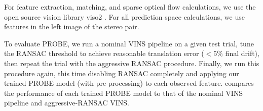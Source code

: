 For feature extraction, matching, and sparse optical flow calculations, we use the open source vision library \textsf{viso2} \citep{Geiger2011-xe}.
For all prediction space calculations, we use features in the left image of the stereo pair.

To evaluate PROBE, we run a nominal VINS pipeline on a given test trial, tune the RANSAC threshold to achieve reasonable translation error ($< 5\%$ final drift), then repeat the trial with the aggressive RANSAC procedure. Finally, we run this procedure again, this time disabling RANSAC completely and applying our trained PROBE model (with pre-processing) to each observed feature.   compares the performance of each trained PROBE model to that of the nominal VINS pipeline and aggressive-RANSAC VINS.

\begin{table}
    \centering
    

\end{table}
